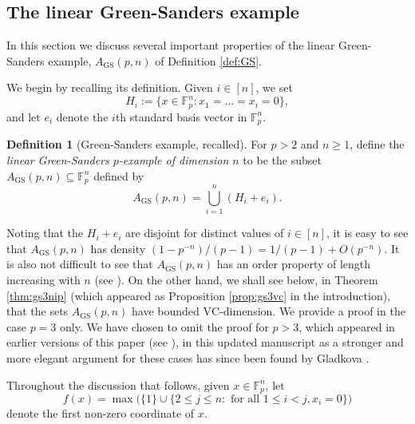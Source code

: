 \documentclass[12pt,oneside,british,a4wide]{amsart}
\numberwithin{equation}{section}
\theoremstyle{definition}
\newtheorem{definition}[theorem]{Definition}
\def\F{\mathbb{F}}
\def\VC{\mathrm{VC}}
\def\GS{\mathrm{GS}}
\begin{document}
\subsection{The linear Green-Sanders example}\label{subsec:gs}

In this section we discuss several important properties of the linear Green-Sanders example, $A_{\GS}(p,n)$ of Definition \ref{def:GS}.

We begin by recalling its definition.  Given $i\in [n]$, we set 
$$
H_i:=\{x\in \mathbb{F}_p^n: x_1=\ldots=x_i=0\},
$$
 and  let $e_i$ denote the $i$th standard basis vector in $\F_p^n$.  

\begin{definition}[Green-Sanders example, recalled]\label{def:GSrecall}
For $p>2$ and $n\geq 1$, define the \emph{linear Green-Sanders $p$-example of dimension $n$} to be the subset $A_\GS(p,n)\subseteq\F_p^n$ defined by
$$
A_{\GS}(p,n)=\bigcup_{i=1}^n (H_i+e_i).
$$
\end{definition}

Noting that the $H_i+e_i$ are disjoint for distinct values of $i\in [n]$, it is easy to see that $A_\GS(p,n)$ has density $(1-p^{-n})/(p-1)=1/(p-1)+O(p^{-n})$. It is also not difficult to see that $A_{\GS}(p,n)$ has an order property of length increasing with $n$ (see \cite[Example 4]{Terry.2019}). On the other hand, we shall see below, in Theorem \ref{thm:gs3nip} (which appeared as Proposition \ref{prop:gs3vc} in the introduction), that the sets $A_{\GS}(p,n)$ have bounded $\VC$-dimension.  We provide a proof in the case $p=3$ only. We have chosen to omit the proof for $p>3$, which appeared in earlier versions of this paper (see \cite[Appendix A.2]{Terry.2021av2}), in this updated manuscript as a stronger and more elegant argument for these cases has since been found by Gladkova \cite{Gladkova.2024}.  

Throughout the discussion that follows, given $x\in \F_p^n$, let
$$
f(x)=\max\Big( \{1\}\cup \{2\leq j\leq n: \text{ for all }1\leq i< j, x_i=0\}\Big)
$$
denote the first non-zero coordinate of $x$. 
\end{document}
